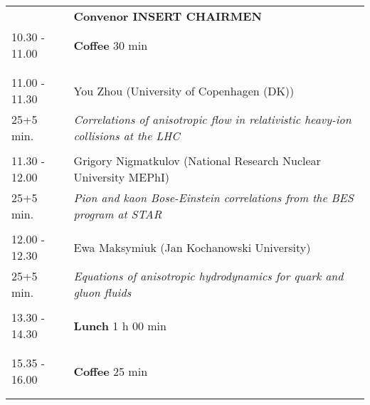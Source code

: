\begin{longtable}{p{3cm}p{13cm}}
&\hfill {\bf Convenor INSERT CHAIRMEN }\\ 
10.30 - 11.00 & {\bf Coffee} \hfill 30 min \\ 
 & \\ 
 & \\ 
11.00 - 11.30 & You Zhou (University of Copenhagen (DK))\\ 
25+5 min. & {\it Correlations of anisotropic flow in relativistic heavy-ion collisions at the LHC}\\ 
 & \\ 
11.30 - 12.00 & Grigory Nigmatkulov (National Research Nuclear University MEPhI)\\ 
25+5 min. & {\it Pion and kaon Bose-Einstein correlations from the BES program at STAR}\\ 
 & \\ 
12.00 - 12.30 & Ewa Maksymiuk (Jan Kochanowski University)\\ 
25+5 min. & {\it Equations of anisotropic hydrodynamics for quark and gluon fluids}\\ 
 & \\ 
13.30 - 14.30 & {\bf Lunch} \hfill 1 h 00 min \\ 
 & \\ 
 & \\ 
15.35 - 16.00 & {\bf Coffee} \hfill 25 min \\ 
 & \\ 
 & \\ 
\end{longtable}

